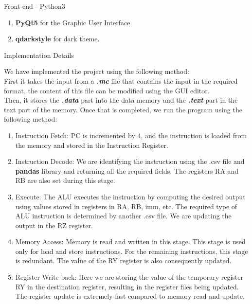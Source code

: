 \documentclass{article}
\begin{document}
Front-end - Python3
\begin{enumerate}
  \item {\bf PyQt5} for the Graphic User Interface.
  \item {\bf qdarkstyle} for dark theme.
\end{enumerate}

\newpage
\begin{centering}
\begin{Huge}
\textsf{Implementation Details}\\
\end{Huge}
\end{centering}
\protect\vspace{1.0cm}
We have implemented the project using the following method:\\

First it takes the input from a \textsl{\textbf{.mc}} file that contains the input in the required format, the content of this file can be modified using the GUI editor.\\
Then, it stores the \textsl{\textbf{.data}} part into the data memory and the \textsl{\textbf{.text}} part in the text part of the memory.
Once that is completed, we run the program using the following method:
\begin{enumerate}
\item Instruction Fetch: PC is incremented by 4, and the instruction is loaded from the memory and stored in the Instruction Register.
\item Instruction Decode: We are identifying the instruction using the .csv file and {\bf pandas} library and returning all the required fields. The registers RA and RB are also set during this stage.
\item Execute: The ALU executes the instruction by computing the desired output using values stored in registers in RA, RB, imm, etc. The required type of ALU instruction is determined by another .csv file. We are updating the output in the RZ register.
\item Memory Access: Memory is read and written in this stage. This stage is used only for load and store instructions. For the remaining instructions, this stage is redundant. The value of the RY register is also consequently updated.
\item Register Write-back: Here we are storing the value of the temporary register RY in the destination register, resulting in the register files being updated. The register update is extremely fast compared to memory read and update.
\end{enumerate}
\end{document}
